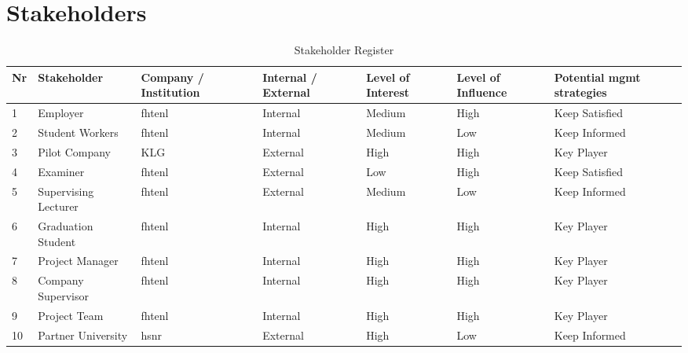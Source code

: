 \chapter{Stakeholders}\label{cha:stakeholders}

\begin{table}[htbp]
\centering
\begin{tabular}{|p{.03\linewidth}|p{.22\linewidth}|p{.12\linewidth}|p{.13\linewidth}|p{.1\linewidth}|p{.1\linewidth}|p{.19\linewidth}|}
\hline
\textbf{Nr} & \textbf{Stakeholder} & \textbf{Company / Institution} & \textbf{Internal / External} & \textbf{Level of Interest} & \textbf{Level of Influence} & \textbf{Potential mgmt strategies} \\ \hline
1  & Employer             & \gls{fhtenl}        & Internal            & Medium            & High               & Keep Satisfied            \\ \hline
2  & Student Workers      & \gls{fhtenl}        & Internal            & Medium            & Low                & Keep Informed             \\ \hline
3  & Pilot Company        & KLG                   & External            & High              & High               & Key Player                \\ \hline
4  & Examiner             & \gls{fhtenl}        & External            & Low               & High               & Keep Satisfied            \\ \hline
5  & Supervising Lecturer & \gls{fhtenl}        & External            & Medium            & Low                & Keep Informed             \\ \hline
6  & Graduation Student   & \gls{fhtenl}        & Internal            & High              & High               & Key Player                \\ \hline
7  & Project Manager      & \gls{fhtenl}        & Internal            & High              & High               & Key Player                \\ \hline
8  & Company Supervisor   & \gls{fhtenl}        & Internal            & High              & High               & Key Player                \\ \hline
9  & Project Team         & \gls{fhtenl}        & Internal            & High              & High               & Key Player                \\ \hline
10 & Partner University   & \gls{hsnr}          & External            & High              & Low                & Keep Informed             \\ \hline
\end{tabular}
\caption{Stakeholder Register}
\label{tab:stakeholder}
\end{table}

